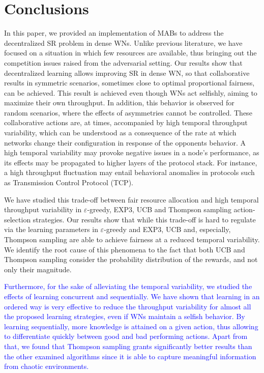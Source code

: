 \documentclass[preprint,12pt]{elsarticle}
\begin{document}
	\section{Conclusions }
	\label{section:conclusions}
	In this paper, we provided an implementation of MABs to address the decentralized SR problem in dense WNs. Unlike previous literature, we have focused on a situation in which few resources are available, thus bringing out the competition issues raised from the adversarial setting. Our results show that decentralized learning allows improving SR in dense WN, so that collaborative results in symmetric scenarios, sometimes close to optimal proportional fairness, can be achieved. This result is achieved even though WNs act selfishly, aiming to maximize their own throughput. In addition, this behavior is observed for random scenarios, where the effects of asymmetries cannot be controlled. %
	These collaborative actions are, at times, accompanied by high temporal throughput variability, which can be understood as a consequence of the  rate at which networks change their configuration in response of the opponents behavior. A high temporal variability may provoke negative issues in a node's performance, as its effects may be propagated to higher layers of the protocol stack. For instance, a high throughput fluctuation may entail behavioral anomalies in protocols such as Transmission Control Protocol (TCP). 
	
	We have studied this trade-off between fair resource allocation and high temporal throughput variability in $\varepsilon$-greedy, EXP3, UCB and Thompson sampling action-selection strategies. Our results show that while this trade-off is hard to regulate via the learning parameters in $\varepsilon$-greedy and EXP3, UCB  and, especially, Thompson sampling are able to achieve fairness at a reduced temporal variability. We identify the root cause of this phenomena to the fact that both UCB and Thompson sampling consider the probability distribution of the rewards, and not only their magnitude.
	
	\textcolor{blue}{Furthermore, for the sake of alleviating the temporal variability, we studied the effects of learning concurrent and sequentially. We have shown that learning in an ordered way is very effective to reduce the throughput variability for almost all the proposed learning strategies, even if WNs maintain a selfish behavior. By learning sequentially, more knowledge is attained on a given action, thus allowing to differentiate quickly between good and bad performing actions. \textcolor{blue}{Apart from that, we found that Thompson sampling grants significantly better results than the other examined algorithms since it is able to capture meaningful information from chaotic environments.}}
	
\end{document}
